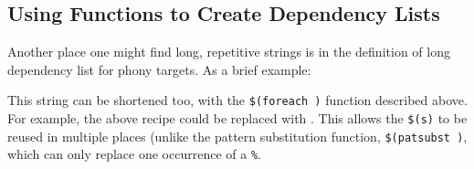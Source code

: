 \subsection{Using Functions to Create Dependency Lists}

Another place one might find long, repetitive strings is in the definition of long dependency list for phony targets. As a brief example: \texttt{}

This string can be shortened too, with the \texttt{\$(foreach )} function described above. For example, the above recipe could be replaced with
\texttt{}. This allows the \texttt{\$(s)} to be reused in multiple places (unlike the pattern substitution function,  \texttt{\$(patsubst )}, which can only replace one occurrence of a \texttt{\%}.